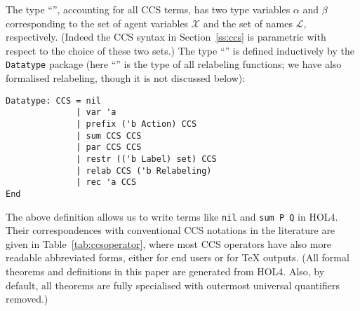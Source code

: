 The type ``'', accounting for all CCS terms,
has two type variables $\alpha$ and $\beta$ corresponding
to the set of agent variables $\mathscr{X}$
and the set of names $\mathscr{L}$,
respectively. (Indeed the CCS syntax in Section~\ref{ss:ccs} is parametric
with respect to the choice of these two sets.)
%
The type ``'' is defined inductively by the
\texttt{Datatype} package
(here ``'' is the type of all relabeling
  functions; we have also formalised relabeling, though it is not
  discussed below):
\begin{lstlisting}
Datatype: CCS = nil
              | var 'a
              | prefix ('b Action) CCS
              | sum CCS CCS
              | par CCS CCS
              | restr (('b Label) set) CCS
              | relab CCS ('b Relabeling)
              | rec 'a CCS
End
\end{lstlisting}
The above definition allows us to write terms like \texttt{nil} and
\texttt{sum P Q} in HOL4. Their correspondences with conventional CCS notations
in the literature are given in Table~\ref{tab:ccsoperator}, where
most CCS operators have also more readable abbreviated forms,
either for end users or for \TeX{} outputs. (All
  formal theorems and definitions in this paper
  are generated from HOL4. Also, by default, all theorems are fully
  specialised with outermost universal quantifiers removed.)

